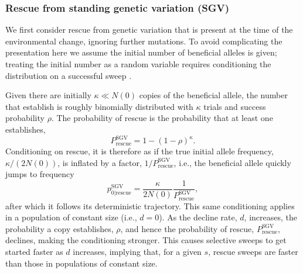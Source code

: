 \documentclass[]{article}
\begin{document}
\subsubsection*{Rescue from standing genetic variation (SGV)}
\label{sec:rescue_forward_SGV}

We first consider rescue from genetic variation that is present at the time of the environmental change, ignoring further mutations.
To avoid complicating the presentation here we assume the initial number of beneficial alleles is given; treating the initial number as a random variable requires conditioning the distribution on a successful sweep \citep[][]{hermisson2017soft}.

Given there are initially $\kappa\ll N(0)$ copies of the beneficial allele, the number that establish is roughly binomially distributed with $\kappa$ trials and success probability $\rho$.
The probability of rescue is the probability that at least one establishes,
\begin{equation}
P_\mathrm{rescue}^\mathrm{SGV} = 1-(1-\rho)^\kappa.
\end{equation}
Conditioning on rescue, it is therefore as if the true initial allele frequency, $\kappa/(2N(0))$, is inflated by a factor, $1/P_\mathrm{rescue}^\mathrm{SGV}$, i.e., the beneficial allele quickly jumps to frequency \citep[c.f., equation S1.4 in][]{orr2014population}
\begin{equation}\label{eq:p0sgv}
p_{0|\mathrm{rescue}}^{\mathrm{SGV}} = \frac{\kappa}{2N(0)} \frac{1}{P_{\mathrm{rescue}}^{\mathrm{SGV}}},
\end{equation}
after which it follows its deterministic trajectory.
This same conditioning applies in a population of constant size (i.e., $d=0$).
As the decline rate, $d$, increases, the probability a copy establishes, $\rho$, and hence the probability of rescue, $P_\mathrm{rescue}^\mathrm{SGV}$, declines, making the conditioning stronger.
This causes selective sweeps to get started faster as $d$ increases, implying that, for a given $s$, rescue sweeps are faster than those in populations of constant size.
\end{document}
